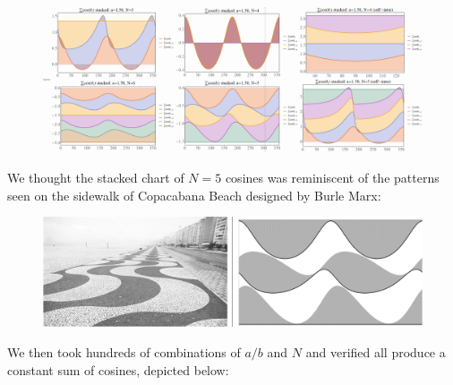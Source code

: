 \documentclass[]{article}
\begin{document}
\begin{figure}[H]

{\centering \includegraphics[width=1\linewidth]{pics/stacked_cosine_sums} 

}

\end{figure}

We thought the stacked chart of \(N=5\) cosines was reminiscent of the patterns seen on the sidewalk of Copacabana Beach designed by Burle Marx:

\begin{figure}[H]

{\centering \includegraphics[width=0.75\linewidth]{pics/copa_collage} 

}

\end{figure}

We then took hundreds of combinations of \(a/b\) and \(N\) and verified all produce a constant sum of cosines, depicted below:
\end{document}
